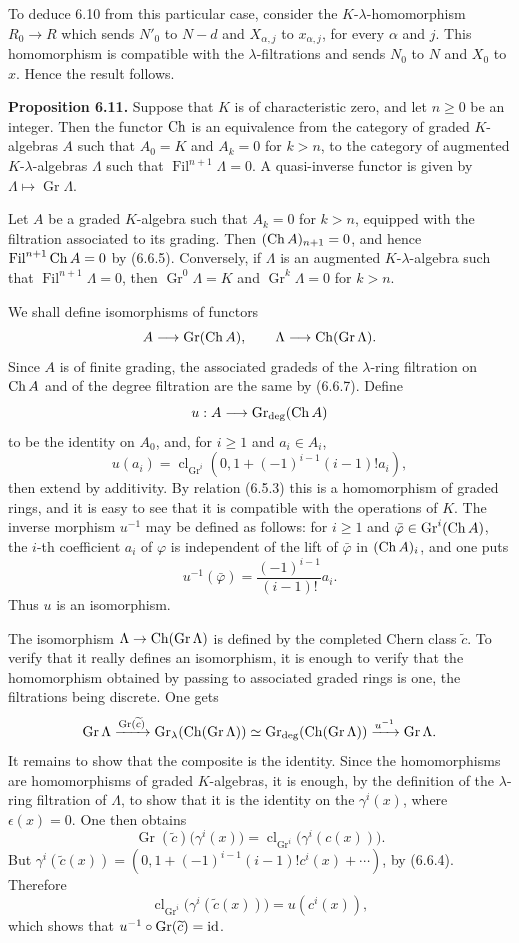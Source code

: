 \documentclass[11pt]{article}
\newcommand{\Gr}{\operatorname{Gr}}
\newcommand{\Fil}{\operatorname{Fil}}
\newcommand{\cl}{\operatorname{cl}}
\providecommand{\Gr}{\operatorname{Gr}}
\providecommand{\Gr}{\operatorname{G}}
\begin{document}
To deduce 6.10 from this particular case, consider the \(K\)-\(\lambda\)-homomorphism \(R_0\to R\) which sends \(N'_0\) to \(N-d\) and \(X_{\alpha,j}\) to \(x_{\alpha,j}\), for every \(\alpha\) and \(j\). This homomorphism is compatible with the \(\lambda\)-filtrations and sends \(N_0\) to \(N\) and \(X_0\) to \(x\). Hence the result follows.

\textbf{Proposition 6.11.} Suppose that \(K\) is of characteristic zero, and let \(n\ge0\) be an integer. Then the functor \(\operatorname{Ch}\) is an equivalence from the category of graded \(K\)-algebras \(A\) such that \(A_0=K\) and \(A_k=0\) for \(k>n\), to the category of augmented \(K\)-\(\lambda\)-algebras \(\Lambda\) such that \(\Fil^{n+1}\Lambda=0\). A quasi-inverse functor is given by \(\Lambda\mapsto\Gr\Lambda\).

Let \(A\) be a graded \(K\)-algebra such that \(A_k=0\) for \(k>n\), equipped with the filtration associated to its grading. Then \((\operatorname{Ch} A)_{n+1}=0\), and hence \(\Fil^{n+1}\Ch A=0\) by (6.6.5). Conversely, if \(\Lambda\) is an augmented \(K\)-\(\lambda\)-algebra such that \(\Fil^{n+1}\Lambda=0\), then \(\Gr^0\Lambda=K\) and \(\Gr^k\Lambda=0\) for \(k>n\).

We shall define isomorphisms of functors
\[
  A\longrightarrow \Gr(\Ch A),
  \qquad
  \Lambda\longrightarrow\Ch(\Gr\Lambda).
\]
Since \(A\) is of finite grading, the associated gradeds of the \(\lambda\)-ring filtration on \(\operatorname{Ch} A\) and of the degree filtration are the same by (6.6.7). Define
\[
  u:A\longrightarrow \Gr_{\deg}(\Ch A)
\]
to be the identity on \(A_0\), and, for \(i\ge1\) and \(a_i\in A_i\),
\[
  u(a_i)=
  \cl_{\Gr^i}\left(0,1+(-1)^{i-1}(i-1)!a_i\right),
\]
then extend by additivity. By relation (6.5.3) this is a homomorphism of graded rings, and it is easy to see that it is compatible with the operations of \(K\). The inverse morphism \(u^{-1}\) may be defined as follows: for \(i\ge1\) and \(\bar\varphi\in\Gr^i(\Ch A)\), the \(i\)-th coefficient \(a_i\) of \(\varphi\) is independent of the lift of \(\bar\varphi\) in \((\operatorname{Ch} A)_i\), and one puts
\[
  u^{-1}(\bar\varphi)=\frac{(-1)^{i-1}}{(i-1)!}a_i.
\]
Thus \(u\) is an isomorphism.

The isomorphism \(\Lambda\to\Ch(\Gr\Lambda)\) is defined by the completed Chern class \(\widetilde c\). To verify that it really defines an isomorphism, it is enough to verify that the homomorphism obtained by passing to associated graded rings is one, the filtrations being discrete. One gets
\[
  \Gr\Lambda
   \xrightarrow{\Gr(\widetilde c)}
  \Gr_{\lambda}(\Ch(\Gr\Lambda))
   \simeq
  \Gr_{\deg}(\Ch(\Gr\Lambda))
   \xrightarrow{u^{-1}}
  \Gr\Lambda .
\]
It remains to show that the composite is the identity. Since the homomorphisms are homomorphisms of graded \(K\)-algebras, it is enough, by the definition of the \(\lambda\)-ring filtration of \(\Lambda\), to show that it is the identity on the \(\gamma^i(x)\), where \(\epsilon(x)=0\). One then obtains
\[
  \Gr(\widetilde c)\bigl(\gamma^i(x)\bigr)
  =
  \cl_{\Gr^i}\bigl(\gamma^i(c(x))\bigr).
\]
But \(\gamma^i(\widetilde c(x))=(0,1+(-1)^{i-1}(i-1)!c^i(x)+\cdots)\), by (6.6.4). Therefore
\[
  \cl_{\Gr^i}\bigl(\gamma^i(\widetilde c(x))\bigr)=u(c^i(x)),
\]
which shows that \(u^{-1}\circ\Gr(\widetilde c)=\id\).
\end{document}
